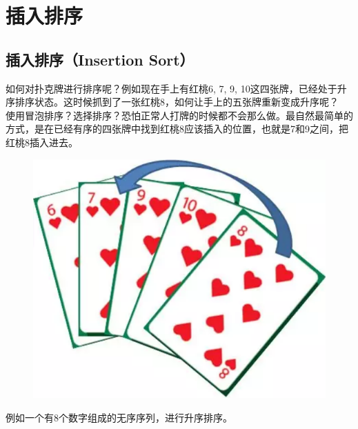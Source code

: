 \newpage

\section{插入排序}

\subsection{插入排序（Insertion Sort）}

如何对扑克牌进行排序呢？例如现在手上有红桃6, 7, 9, 10这四张牌，已经处于升序排序状态。这时候抓到了一张红桃8，如何让手上的五张牌重新变成升序呢？\\

使用冒泡排序？选择排序？恐怕正常人打牌的时候都不会那么做。最自然最简单的方式，是在已经有序的四张牌中找到红桃8应该插入的位置，也就是7和9之间，把红桃8插入进去。

\begin{figure}[H]
	\centering
	\includegraphics[scale=0.4]{img/Chapter8/8-4/1.png}
\end{figure}

例如一个有8个数字组成的无序序列，进行升序排序。

